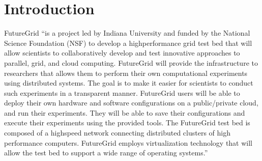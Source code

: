 
\section{Introduction}

FutureGrid \cite{las2010gce,las12fg-bookchapter}``is a project led by Indiana University and funded by the National Science Foundation (NSF) to develop a highperformance grid test bed that will allow scientists to collaboratively develop and test innovative approaches to parallel, grid, and cloud computing. FutureGrid will provide the infrastructure to researchers that allows them to perform their own computational experiments using distributed systems. The goal is to make it easier for scientists to conduct such experiments in a transparent manner.  FutureGrid users will be able to deploy their own hardware and software configurations on a public/private cloud, and run their experiments. They will be able to save their configurations and execute their experiments using the provided tools. The FutureGrid test bed is composed of a highspeed network connecting distributed clusters of high performance computers. FutureGrid employs virtualization technology that will allow the test bed to support a wide range of operating systems.''

